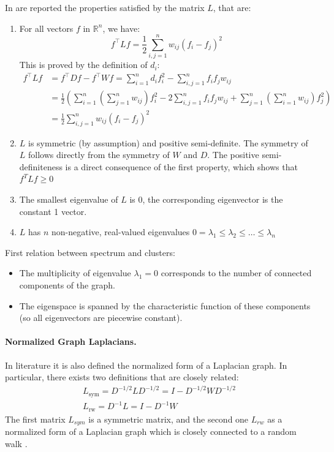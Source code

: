 In \cite{spectral_tutorial} are reported the properties satisfied by the matrix $L$, that are:
\begin{enumerate}
	\item For all vectors $f$ in $\mathbb{R}^n$, we have:
	$$f ^ { \top } L f = \frac { 1 } { 2 } \sum _ { i, j = 1 } ^ { n } w _ { i j } \left( f _ { i } - f _ { j } \right) ^ { 2 }$$
	This is proved by the definition of $d_i$:
	$$\begin{aligned} 
	f ^ { \top } L f & = f ^ { \top } D f - f ^ { \top } W f = \sum _ { i=1 }^n d _ { i } f _ { i } ^ { 2 } - \sum _ { i , j =1 }^n f _ { i } f _ { j } w _ { i j } \\ 
	& = \frac { 1 } { 2 } \left( \sum _ { i=1 }^n \left( \sum _ { j=1 }^n w _ { i j } \right) f _ { i } ^ { 2 } - 2 \sum _ { i, j=1 }^n f _ { i } f _ { j } w _ { i j } + \sum _ { j=1 }^n \left( \sum _ { i=1 }^n w _ { i j } \right) f _ { j } ^ { 2 } \right) \\ 
	& = \frac { 1 } { 2 } \sum _ { i ,j=1 }^n w _ { i j } \left( f _ { i } - f _ { j } \right) ^ { 2 } 
	\end{aligned}$$
	
	\item $L$ is symmetric (by assumption) and positive semi-definite. The symmetry of $L$ follows directly from the symmetry of $W$ and $D$. The positive semi-definiteness is a direct consequence of the first property, which shows that 	$f ^ { T } L f \geq 0$
	
	\item The smallest eigenvalue of $L$ is 0, the corresponding eigenvector is the constant 1 vector.
	\item $L$ has $n$ non-negative, real-valued eigenvalues $0 = \lambda _ { 1 } \leq \lambda _ { 2 } \leq \ldots \leq \lambda _ { n }$
\end{enumerate}

First relation between spectrum and clusters:
\begin{itemize}
	\item The multiplicity of eigenvalue $\lambda_1=0$ corresponds to the number of connected components of the graph.
	\item The eigenspace is spanned by the characteristic function of these components (so all eigenvectors are piecewise constant).
\end{itemize}

\paragraph{Normalized Graph Laplacians.} In literature it is also defined the normalized form of a Laplacian graph. In particular, there exists two definitions that are closely related:
$$\begin{array} { l } { L _ { \mathrm { sym } } = D ^ { - 1 / 2 } L D ^ { - 1 / 2 } = I - D ^ { - 1 / 2 } W D ^ { - 1 / 2 } } \\ { L _ { \mathrm { rw } } = D ^ { - 1 } L = I - D ^ { - 1 } W } \end{array}$$
The first matrix $L_{sym}$ is a symmetric matrix, and the second one $L_{rw}$ as a normalized form of a Laplacian graph which is closely connected to a random walk \cite{spectral_tutorial}.

